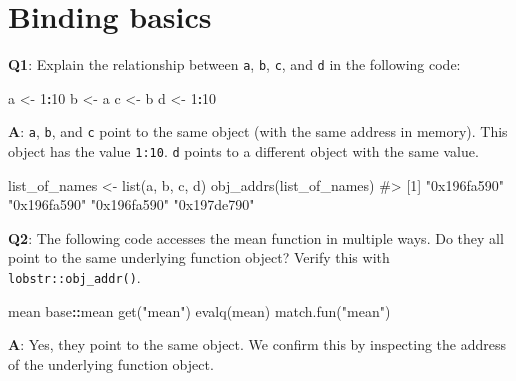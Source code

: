 \documentclass[
]{krantz}
\makeatletter
\newenvironment{Shaded}{\begin{snugshade}}{\end{snugshade}}
\newcommand{\CommentTok}[1]{\textcolor[rgb]{0.56,0.35,0.01}{\textit{#1}}}
\newcommand{\DecValTok}[1]{\textcolor[rgb]{0.00,0.00,0.81}{#1}}
\newcommand{\KeywordTok}[1]{\textcolor[rgb]{0.13,0.29,0.53}{\textbf{#1}}}
\newcommand{\NormalTok}[1]{#1}
\newcommand{\OperatorTok}[1]{\textcolor[rgb]{0.81,0.36,0.00}{\textbf{#1}}}
\newcommand{\StringTok}[1]{\textcolor[rgb]{0.31,0.60,0.02}{#1}}
\newenvironment{kframe}{%
\medskip{}
\setlength{\fboxsep}{.8em}
 \def\at@end@of@kframe{}%
 \ifinner\ifhmode%
  \def\at@end@of@kframe{\end{minipage}}%
  \begin{minipage}{\columnwidth}%
 \fi\fi%
 \def\FrameCommand##1{\hskip\@totalleftmargin \hskip-\fboxsep
 \colorbox{shadecolor}{##1}\hskip-\fboxsep
     \hskip-\linewidth \hskip-\@totalleftmargin \hskip\columnwidth}%
 \MakeFramed {\advance\hsize-\width
   \@totalleftmargin\z@ \linewidth\hsize
   \@setminipage}}%
 {\par\unskip\endMakeFramed%
 \at@end@of@kframe}
\renewenvironment{Shaded}{\begin{kframe}}{\end{kframe}}
\renewcommand{\KeywordTok} [1]{\textcolor[rgb]{0.00,0.44,0.13}{{#1}}}
\renewcommand{\DecValTok}  [1]{\textcolor[rgb]{0.25,0.63,0.44}{{#1}}}
\renewcommand{\StringTok}  [1]{\textcolor[rgb]{0.25,0.44,0.63}{{#1}}}
\renewcommand{\CommentTok} [1]{\textcolor[rgb]{0.38,0.63,0.69}{{#1}}}
\renewcommand{\NormalTok}  [1]{{#1}}
\makeatother
\begin{document}

\hypertarget{binding-basics}{%
\section{Binding basics}\label{binding-basics}}

\textbf{{Q1}}: Explain the relationship between \texttt{a}, \texttt{b}, \texttt{c}, and \texttt{d} in the following code:

\begin{Shaded}
\begin{Highlighting}[]
\NormalTok{a <-}\StringTok{ }\DecValTok{1}\OperatorTok{:}\DecValTok{10}
\NormalTok{b <-}\StringTok{ }\NormalTok{a}
\NormalTok{c <-}\StringTok{ }\NormalTok{b}
\NormalTok{d <-}\StringTok{ }\DecValTok{1}\OperatorTok{:}\DecValTok{10}
\end{Highlighting}
\end{Shaded}

\textbf{{A}}: \texttt{a}, \texttt{b}, and \texttt{c} point to the same object (with the same address in memory). This object has the value \texttt{1:10}. \texttt{d} points to a different object with the same value.

\begin{Shaded}
\begin{Highlighting}[]
\NormalTok{list_of_names <-}\StringTok{ }\KeywordTok{list}\NormalTok{(a, b, c, d)}
\KeywordTok{obj_addrs}\NormalTok{(list_of_names)}
\CommentTok{#> [1] "0x196fa590" "0x196fa590" "0x196fa590" "0x197de790"}
\end{Highlighting}
\end{Shaded}

\textbf{{Q2}}: The following code accesses the mean function in multiple ways. Do they all point to the same underlying function object? Verify this with \texttt{lobstr::obj\_addr()}.

\begin{Shaded}
\begin{Highlighting}[]
\NormalTok{mean}
\NormalTok{base}\OperatorTok{::}\NormalTok{mean}
\KeywordTok{get}\NormalTok{(}\StringTok{"mean"}\NormalTok{)}
\KeywordTok{evalq}\NormalTok{(mean)}
\KeywordTok{match.fun}\NormalTok{(}\StringTok{"mean"}\NormalTok{)}
\end{Highlighting}
\end{Shaded}

\textbf{{A}}: Yes, they point to the same object. We confirm this by inspecting the address of the underlying function object.
\end{document}

